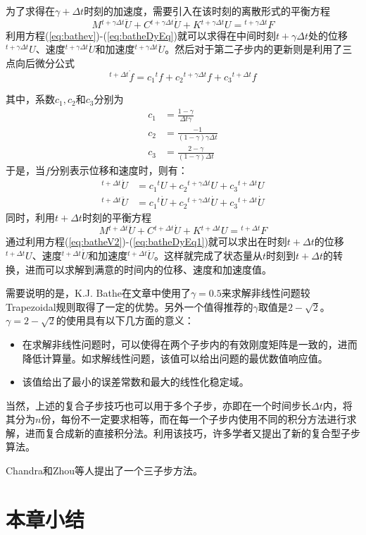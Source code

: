 为了求得在$\gamma+\Delta t$时刻的加速度，需要引入在该时刻的离散形式的平衡方程
\begin{equation}
	M{^{t+\gamma\Delta t}\!\ddot{U}}+C{^{t+\gamma\Delta t}\!\dot{U}}+K{^{t+\gamma\Delta t}\!U}={^{t+\gamma\Delta t}\!F}\label{eq:batheDyEq}
\end{equation}
利用方程(\ref{eq:bathev})-(\ref{eq:batheDyEq})就可以求得在中间时刻$t+\gamma\Delta t$处的位移${^{t+\gamma\Delta t}\!U}$、速度${^{t+\gamma\Delta t}\!\dot{U}}$和加速度${^{t+\gamma\Delta t}\!\ddot{U}}$。然后对于第二子步内的更新则是利用了三点向后微分公式\cite{Bathe2005}
\begin{equation}	
	{^{t+\Delta t}\!\dot{f}}=c_1{^t\!f}+c_2{^{t+\gamma\Delta t}\!f}+c_3{^{t+\Delta t}\!f}
\end{equation}

其中，系数$c_1,c_2$和$c_3$分别为
\begin{align}
	c_1&=\frac{1-\gamma}{\Delta t\gamma}\\
	c_2&=\frac{-1}{(1-\gamma)\gamma\Delta t}\\
	c_3&=\frac{2-\gamma}{(1-\gamma)\Delta t}
\end{align}
于是，当$f$分别表示位移和速度时，则有：
\begin{align}
	{^{t+\Delta t}\!\dot{U}}&=c_1{^t\!U}+c_2{^{t+\gamma\Delta t}\!U}+c_3{^{t+\Delta t}\!U}\label{eq:batheV2}\\
	{^{t+\Delta t}\!\ddot{U}}&=c_1{^t\!\dot{U}}+c_2{^{t+\gamma\Delta t}\!\dot{U}}+c_3{^{t+\Delta t}\!\dot{U}}\label{eq:batheA2}
\end{align}
同时，利用$t+\Delta t$时刻的平衡方程
\begin{equation}
	M{^{t+\Delta t}\!\ddot{U}}+C{^{t+\Delta t}\!\dot{U}}+K{^{t+\Delta t}\!U}={^{t+\Delta t}\!F}\label{eq:batheDyEq1}
\end{equation}
通过利用方程(\ref{eq:batheV2})-(\ref{eq:batheDyEq1})就可以求出在时刻$t+\Delta t$的位移${^{t+\Delta t}\!U}$、速度${^{t+\Delta t}\!\dot{U}}$和加速度${^{t+\Delta t}\!\ddot{U}}$。这样就完成了状态量从$t$时刻到$t+\Delta t$的转换，进而可以求解到满意的时间内的位移、速度和加速度值。

需要说明的是，K.J. Bathe在文章中使用了$\gamma=0.5$来求解非线性问题较Trapezoidal规则取得了一定的优势。另外一个值得推荐的$\gamma$取值是$2-\sqrt{2}$。$\gamma=2-\sqrt{2}$的使用具有以下几方面的意义：
\begin{itemize}
	\item 在求解非线性问题时，可以使得在两个子步内的有效刚度矩阵是一致的，进而降低计算量\cite{Dharmaraja2009,Bathe2007,Bathe2012a}。如求解线性问题，该值可以给出问题的最优数值响应值\cite{Bathe2007,Bathe2012a}。
	\item 该值给出了最小的误差常数和最大的线性化稳定域\cite{Dharmaraja2009}。
\end{itemize}

当然，上述的复合子步技巧也可以用于多个子步，亦即在一个时间步长$\Delta t$内，将其分为$n$份，每份不一定要求相等，而在每一个子步内使用不同的积分方法进行求解，进而复合成新的直接积分法。利用该技巧，许多学者又提出了新的复合型子步算法。

Chandra和Zhou等人提出了一个三子步方法。

\section{本章小结}

